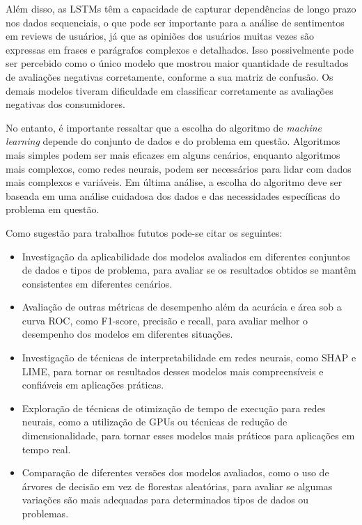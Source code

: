 Além disso, as LSTMs têm a capacidade de capturar dependências de longo prazo nos dados sequenciais, o que pode ser importante para a análise de sentimentos em reviews de usuários, já que as opiniões dos usuários muitas vezes são expressas em frases e parágrafos complexos e detalhados. Isso possivelmente pode ser percebido como o único modelo que mostrou maior quantidade de resultados de avaliações negativas corretamente, conforme a sua matriz de confusão. Os demais modelos tiveram dificuldade em classificar corretamente as avaliações negativas dos consumidores.

No entanto, é importante ressaltar que a escolha do algoritmo de \textit{machine learning} depende do conjunto de dados e do problema em questão. Algoritmos mais simples podem ser mais eficazes em alguns cenários, enquanto algoritmos mais complexos, como redes neurais, podem ser necessários para lidar com dados mais complexos e variáveis. Em última análise, a escolha do algoritmo deve ser baseada em uma análise cuidadosa dos dados e das necessidades específicas do problema em questão.

Como sugestão para trabalhos fututos pode-se citar os seguintes:

\begin{itemize}
    \item Investigação da aplicabilidade dos modelos avaliados em diferentes conjuntos de dados e tipos de problema, para avaliar se os resultados obtidos se mantêm consistentes em diferentes cenários.
    \item Avaliação de outras métricas de desempenho além da acurácia e área sob a curva ROC, como F1-score, precisão e recall, para avaliar melhor o desempenho dos modelos em diferentes situações.
    \item Investigação de técnicas de interpretabilidade em redes neurais, como SHAP e LIME, para tornar os resultados desses modelos mais compreensíveis e confiáveis em aplicações práticas.
    \item Exploração de técnicas de otimização de tempo de execução para redes neurais, como a utilização de GPUs ou técnicas de redução de dimensionalidade, para tornar esses modelos mais práticos para aplicações em tempo real.
    \item Comparação de diferentes versões dos modelos avaliados, como o uso de árvores de decisão em vez de florestas aleatórias, para avaliar se algumas variações são mais adequadas para determinados tipos de dados ou problemas.
\end{itemize}